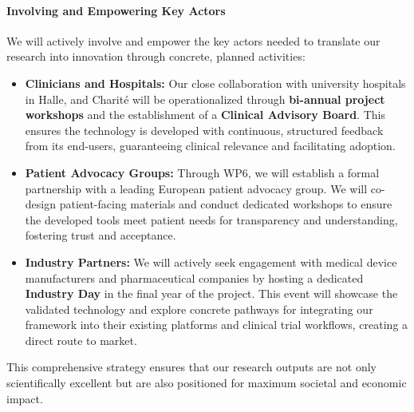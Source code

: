 \documentclass[11pt, a4paper]{article}
\begin{document}
\paragraph{Involving and Empowering Key Actors}
We will actively involve and empower the key actors needed to translate our research into innovation through concrete, planned activities:
\begin{itemize}
    \item \textbf{Clinicians and Hospitals:} Our close collaboration with university hospitals in Halle, and Charité will be operationalized through \textbf{bi-annual project workshops} and the establishment of a \textbf{Clinical Advisory Board}. This ensures the technology is developed with continuous, structured feedback from its end-users, guaranteeing clinical relevance and facilitating adoption.
    \item \textbf{Patient Advocacy Groups:} Through WP6, we will establish a formal partnership with a leading European patient advocacy group. We will co-design patient-facing materials and conduct dedicated workshops to ensure the developed tools meet patient needs for transparency and understanding, fostering trust and acceptance.
    \item \textbf{Industry Partners:} We will actively seek engagement with medical device manufacturers and pharmaceutical companies by hosting a dedicated \textbf{Industry Day} in the final year of the project. This event will showcase the validated technology and explore concrete pathways for integrating our framework into their existing platforms and clinical trial workflows, creating a direct route to market.
\end{itemize}
This comprehensive strategy ensures that our research outputs are not only scientifically excellent but are also positioned for maximum societal and economic impact.
\end{document}
